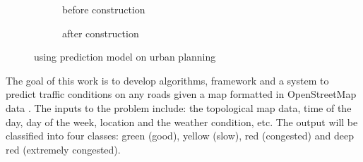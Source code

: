 \begin{figure}[th]
    \centering
	\begin{subfigure}[t]{0.49\columnwidth}
	\caption{before construction}
	\label{fig:urban1}
	\end{subfigure}
	\begin{subfigure}[t]{0.49\columnwidth}
	\caption{after construction}
	\label{fig:urban2}
	\end{subfigure}
	\caption{using prediction model on urban planning}
\end{figure}

The goal of this work is to develop algorithms, framework and a system to 
predict traffic conditions on any roads given a map formatted in 
OpenStreetMap data \cite{openstreetmap}. The inputs to the problem include: 
the topological  map data, time of the day, day of the week, 
location and the weather condition, etc. The output will be classified 
into four classes: green (good), yellow (slow), red (congested) 
and deep red  (extremely congested). 

